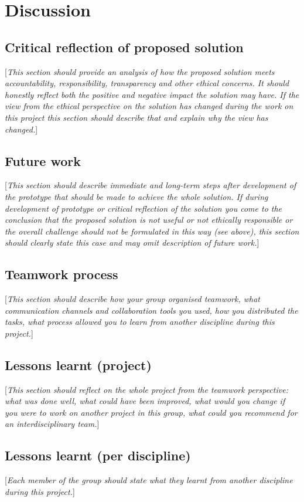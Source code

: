 \documentclass[10pt,english, openany]{book}
\begin{document}
\chapter{Discussion}\label{chapt:results}
\section{Critical reflection of proposed solution}
[\textit{This section should provide an analysis of how the proposed solution meets accountability, responsibility, transparency and other ethical concerns. It should honestly reflect both the positive and negative impact the solution may have. If the view from the ethical perspective on the solution has changed during the work on this project this section should describe that and explain why the view has changed.}]

\section{Future work}
[\textit{This section should describe immediate and long-term steps after development of the prototype that should be made to achieve the whole solution. If during development of prototype or critical reflection of the solution you come to the conclusion that the proposed solution is not useful or not ethically responsible or the overall challenge should not be formulated in this way (see above), this section should clearly state this case and may omit description of future work.}]

\section{Teamwork process}
[\textit{This section should describe how your group organised teamwork, what communication channels and collaboration tools you used, how you distributed the tasks, what process allowed you to learn from another discipline during this project.}]

\section{Lessons learnt (project)}
[\textit{This section should reflect on the whole project from the teamwork perspective: what was done well, what could have been improved, what would you change if you were to work on another project in this group, what could you recommend for an interdisciplinary team.}]

\section{Lessons learnt (per discipline)}
[\textit{Each member of the group should state what they learnt from another discipline during this project.}]
\end{document}
